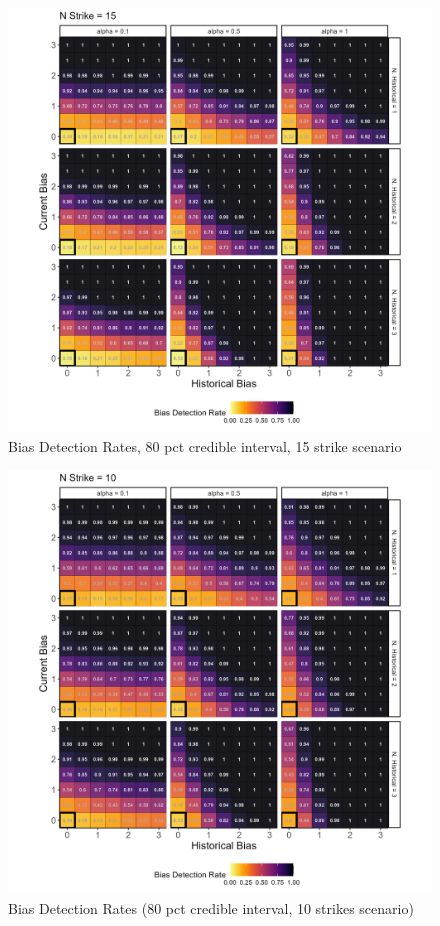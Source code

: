 \documentclass[12pt]{article}
\begin{document}
\begin{figure}

{\centering \includegraphics[width=0.95\linewidth]{../figures/pp15_80CI} 

}

\caption{Bias Detection Rates, 80 pct credible interval, 15 strike scenario}\label{fig:figbd8015}
\end{figure}

\begin{figure}

{\centering \includegraphics[width=0.95\linewidth]{../figures/pp10_80CI} 

}

\caption{Bias Detection Rates (80 pct credible interval, 10 strikes scenario)}\label{fig:figbd8010}
\end{figure}
\end{document}
